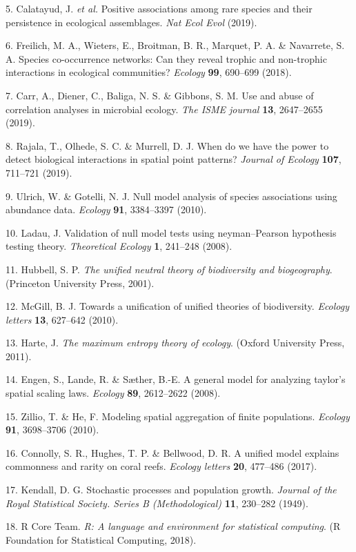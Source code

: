 \documentclass[]{article}
\begin{document}
\hypertarget{ref-calatayud2019}{}
5. Calatayud, J. \emph{et al.} Positive associations among rare species
and their persistence in ecological assemblages. \emph{Nat Ecol Evol}
(2019).

\hypertarget{ref-freilich2018}{}
6. Freilich, M. A., Wieters, E., Broitman, B. R., Marquet, P. A. \&
Navarrete, S. A. Species co-occurrence networks: Can they reveal trophic
and non-trophic interactions in ecological communities? \emph{Ecology}
\textbf{99}, 690--699 (2018).

\hypertarget{ref-carr2019}{}
7. Carr, A., Diener, C., Baliga, N. S. \& Gibbons, S. M. Use and abuse
of correlation analyses in microbial ecology. \emph{The ISME journal}
\textbf{13}, 2647--2655 (2019).

\hypertarget{ref-rajala2019}{}
8. Rajala, T., Olhede, S. C. \& Murrell, D. J. When do we have the power
to detect biological interactions in spatial point patterns?
\emph{Journal of Ecology} \textbf{107}, 711--721 (2019).

\hypertarget{ref-ulrich2010}{}
9. Ulrich, W. \& Gotelli, N. J. Null model analysis of species
associations using abundance data. \emph{Ecology} \textbf{91},
3384--3397 (2010).

\hypertarget{ref-ladau2008}{}
10. Ladau, J. Validation of null model tests using neyman--Pearson
hypothesis testing theory. \emph{Theoretical Ecology} \textbf{1},
241--248 (2008).

\hypertarget{ref-hubbell2001}{}
11. Hubbell, S. P. \emph{The unified neutral theory of biodiversity and
biogeography}. (Princeton University Press, 2001).

\hypertarget{ref-mcgill2010}{}
12. McGill, B. J. Towards a unification of unified theories of
biodiversity. \emph{Ecology letters} \textbf{13}, 627--642 (2010).

\hypertarget{ref-harte2011}{}
13. Harte, J. \emph{The maximum entropy theory of ecology}. (Oxford
University Press, 2011).

\hypertarget{ref-engen2008}{}
14. Engen, S., Lande, R. \& Sæther, B.-E. A general model for analyzing
taylor's spatial scaling laws. \emph{Ecology} \textbf{89}, 2612--2622
(2008).

\hypertarget{ref-zillio2010}{}
15. Zillio, T. \& He, F. Modeling spatial aggregation of finite
populations. \emph{Ecology} \textbf{91}, 3698--3706 (2010).

\hypertarget{ref-connolly2017}{}
16. Connolly, S. R., Hughes, T. P. \& Bellwood, D. R. A unified model
explains commonness and rarity on coral reefs. \emph{Ecology letters}
\textbf{20}, 477--486 (2017).

\hypertarget{ref-kendall1949}{}
17. Kendall, D. G. Stochastic processes and population growth.
\emph{Journal of the Royal Statistical Society. Series B
(Methodological)} \textbf{11}, 230--282 (1949).

\hypertarget{ref-rcore}{}
18. R Core Team. \emph{R: A language and environment for statistical
computing}. (R Foundation for Statistical Computing, 2018).
\end{document}
